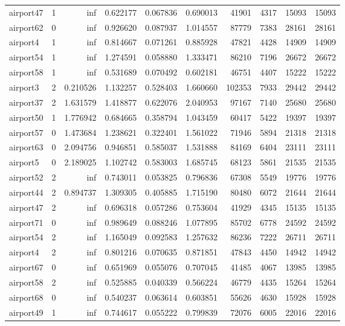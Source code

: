 \begin{longtable}{|l|r|r|r|r|r|r|r|r|r|}
airport47 & 1 & inf & 0.622177 & 0.067836 & 0.690013 & 41901 & 4317 & 15093 & 15093 \\
airport62 & 0 & inf & 0.926620 & 0.087937 & 1.014557 & 87779 & 7383 & 28161 & 28161 \\
airport4 & 1 & inf & 0.814667 & 0.071261 & 0.885928 & 47821 & 4428 & 14909 & 14909 \\
airport54 & 1 & inf & 1.274591 & 0.058880 & 1.333471 & 86210 & 7196 & 26672 & 26672 \\
airport58 & 1 & inf & 0.531689 & 0.070492 & 0.602181 & 46751 & 4407 & 15222 & 15222 \\
airport3 & 2 & 0.210526 & 1.132257 & 0.528403 & 1.660660 & 102353 & 7933 & 29442 & 29442 \\
airport37 & 2 & 1.631579 & 1.418877 & 0.622076 & 2.040953 & 97167 & 7140 & 25680 & 25680 \\
airport50 & 1 & 1.776942 & 0.684665 & 0.358794 & 1.043459 & 60417 & 5422 & 19397 & 19397 \\
airport57 & 0 & 1.473684 & 1.238621 & 0.322401 & 1.561022 & 71946 & 5894 & 21318 & 21318 \\
airport63 & 0 & 2.094756 & 0.946851 & 0.585037 & 1.531888 & 84169 & 6404 & 23111 & 23111 \\
airport5 & 0 & 2.189025 & 1.102742 & 0.583003 & 1.685745 & 68123 & 5861 & 21535 & 21535 \\
airport52 & 2 & inf & 0.743011 & 0.053825 & 0.796836 & 67308 & 5549 & 19776 & 19776 \\
airport44 & 2 & 0.894737 & 1.309305 & 0.405885 & 1.715190 & 80480 & 6072 & 21644 & 21644 \\
airport47 & 2 & inf & 0.696318 & 0.057286 & 0.753604 & 41929 & 4345 & 15135 & 15135 \\
airport71 & 0 & inf & 0.989649 & 0.088246 & 1.077895 & 85702 & 6778 & 24592 & 24592 \\
airport54 & 2 & inf & 1.165049 & 0.092583 & 1.257632 & 86236 & 7222 & 26711 & 26711 \\
airport4 & 2 & inf & 0.801216 & 0.070635 & 0.871851 & 47843 & 4450 & 14942 & 14942 \\
airport67 & 0 & inf & 0.651969 & 0.055076 & 0.707045 & 41485 & 4067 & 13985 & 13985 \\
airport58 & 2 & inf & 0.525885 & 0.040339 & 0.566224 & 46779 & 4435 & 15264 & 15264 \\
airport68 & 0 & inf & 0.540237 & 0.063614 & 0.603851 & 55626 & 4630 & 15928 & 15928 \\
airport49 & 1 & inf & 0.744617 & 0.055222 & 0.799839 & 72076 & 6005 & 22016 & 22016 \\

\end{longtable}
